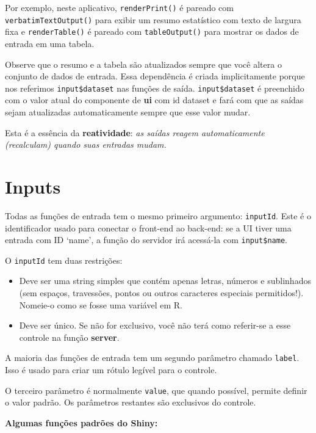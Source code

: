 \documentclass[
]{book}
\begin{document}
Por exemplo, neste aplicativo, \texttt{renderPrint()} é pareado com \texttt{verbatimTextOutput()} para exibir um resumo estatístico com texto de largura fixa e \texttt{renderTable()} é pareado com \texttt{tableOutput()} para mostrar os dados de entrada em uma tabela.

Observe que o resumo e a tabela são atualizados sempre que você altera o conjunto de dados de entrada. Essa dependência é criada implicitamente porque nos referimos \texttt{input\$dataset} nas funções de saída. \texttt{input\$dataset} é preenchido com o valor atual do componente de \textbf{ui} com id dataset e fará com que as saídas sejam atualizadas automaticamente sempre que esse valor mudar.

Esta é a essência da \textbf{reatividade}: \emph{as saídas reagem automaticamente (recalculam) quando suas entradas mudam.}

\hypertarget{inputs}{%
\section{\texorpdfstring{\textbf{Inputs}}{Inputs}}\label{inputs}}

Todas as funções de entrada tem o mesmo primeiro argumento: \texttt{inputId}. Este é o identificador usado para conectar o front-end ao back-end: se a UI tiver uma entrada com ID `name', a função do servidor irá acessá-la com \texttt{input\$name}.

O \texttt{inputId} tem duas restrições:

\begin{itemize}
\item
  Deve ser uma string simples que contém apenas letras, números e sublinhados (sem espaços, travessões, pontos ou outros caracteres especiais permitidos!). Nomeie-o como se fosse uma variável em R.
\item
  Deve ser único. Se não for exclusivo, você não terá como referir-se a esse controle na função \textbf{server}.
\end{itemize}

A maioria das funções de entrada tem um segundo parâmetro chamado \texttt{label}. Isso é usado para criar um rótulo legível para o controle.

O terceiro parâmetro é normalmente \texttt{value}, que quando possível, permite definir o valor padrão. Os parâmetros restantes são exclusivos do controle.

\textbf{Algumas funções padrões do Shiny:}
\end{document}
